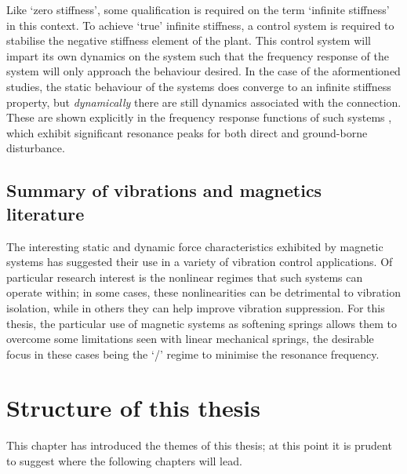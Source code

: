 \documentclass[11pt,a4paper]{memoir}
\begin{document}
Like `zero stiffness', some qualification is required on the term `infinite stiffness' in this context.
To achieve `true' infinite stiffness, a control system is required to stabilise the negative stiffness element of the plant.
This control system will impart its own dynamics on the system such that the frequency response of the system will only approach the behaviour desired.
In the case of the aformentioned studies, the static behaviour of the systems does converge to an infinite stiffness property, but \emph{dynamically} there are still dynamics associated with the connection.
These are shown explicitly in the frequency response functions of such systems \parencite{mizuno2010-jvc}, which exhibit significant resonance peaks for both direct and ground-borne disturbance.

\subsection{Summary of vibrations and magnetics literature}

The interesting static and dynamic force characteristics exhibited by magnetic systems has suggested their use in a variety of vibration control applications.
Of particular research interest is the nonlinear regimes that such systems can operate within; in some cases, these nonlinearities can be detrimental to vibration isolation, while in others they can help improve vibration suppression.
For this thesis, the particular use of magnetic systems as softening springs allows them to overcome some limitations seen with linear mechanical springs, the desirable focus in these cases being the `\qzs/' regime to minimise the resonance frequency.

\newpage
\section{Structure of this thesis}

This chapter has introduced the themes of this thesis; at this point it is prudent to suggest where the following chapters will lead.
\end{document}
